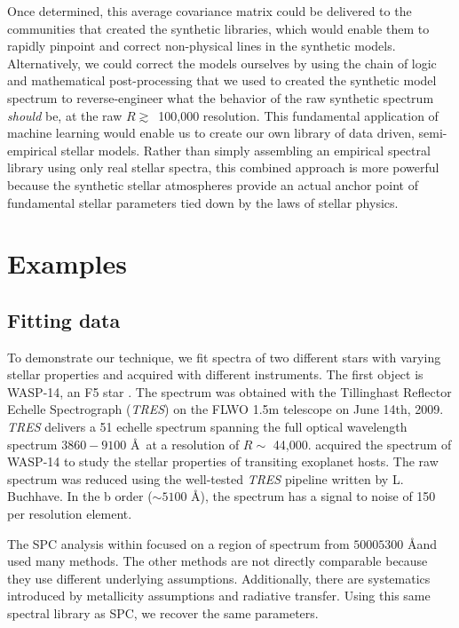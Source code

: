 \documentclass[iop,floatfix]{emulateapj}
\begin{document}
Once determined, this average covariance matrix could be delivered to the communities that created the synthetic libraries, which would enable them to rapidly pinpoint and correct non-physical lines in the synthetic models. Alternatively, we could correct the models ourselves by using the chain of logic and mathematical post-processing that we used to created the synthetic model spectrum to reverse-engineer what the behavior of the raw synthetic spectrum \emph{should} be, at the raw $R \gtrsim$~100,000 resolution. This fundamental application of machine learning would enable us to create our own library of data driven, semi-empirical stellar models. Rather than simply assembling an empirical spectral library using only real stellar spectra, this combined approach is more powerful because the synthetic stellar atmospheres provide an actual anchor point of fundamental stellar parameters tied down by the laws of stellar physics.

\section{Examples}
\label{sec:examples}

\subsection{Fitting data}

To demonstrate our technique, we fit spectra of two different stars with varying stellar properties and acquired with different instruments. The first object is WASP-14, an F5 star \citep{joshi09}. The spectrum was obtained with the Tillinghast Reflector Echelle Spectrograph (\emph{TRES}) \citep{mink11} on the FLWO 1.5m telescope on June 14th, 2009. \emph{TRES} delivers a 51 echelle spectrum spanning the full optical wavelength spectrum $3860 - 9100$ \AA\ at a resolution of $R \sim$ 44,000. \citet{torres12} acquired the spectrum of WASP-14 to study the stellar properties of transiting exoplanet hosts. The raw spectrum was reduced using the well-tested \emph{TRES} pipeline written by L. Buchhave. In the b order ($\sim 5100$ \AA), the spectrum has a signal to noise of 150 per resolution element.

The SPC analysis within \citet{torres12} focused on a region of spectrum from $5000 5300$ \AA and used many methods. The other methods are not directly comparable because they use different underlying assumptions. Additionally, there are systematics introduced by metallicity assumptions and radiative transfer. Using this same spectral library as SPC, we recover the same parameters.
\end{document}
